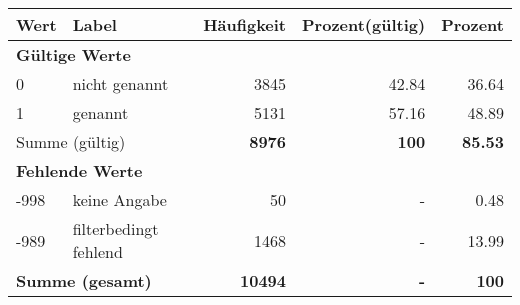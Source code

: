      \begin{longtable}{lXrrr}
     \toprule
     \textbf{Wert} & \textbf{Label} & \textbf{Häufigkeit} & \textbf{Prozent(gültig)} & \textbf{Prozent} \\
     \endhead
     \midrule
     \multicolumn{5}{l}{\textbf{Gültige Werte}}\\

     0 &
     \multicolumn{1}{X}{ nicht genannt   } &


       \num{3845} &
       \num[round-mode=places,round-precision=2]{42.84} &
         \num[round-mode=places,round-precision=2]{36.64} \\

     1 &
     \multicolumn{1}{X}{ genannt   } &


       \num{5131} &
       \num[round-mode=places,round-precision=2]{57.16} &
         \num[round-mode=places,round-precision=2]{48.89} \\
     \midrule
     \multicolumn{2}{l}{Summe (gültig)} &
       \textbf{\num{8976}} &
     \textbf{\num{100}} &
       \textbf{\num[round-mode=places,round-precision=2]{85.53}} \\
     \multicolumn{5}{l}{\textbf{Fehlende Werte}}\\
       -998 &
       keine Angabe &
         \num{50} &
        - &
         \num[round-mode=places,round-precision=2]{0.48} \\
       -989 &
       filterbedingt fehlend &
         \num{1468} &
        - &
         \num[round-mode=places,round-precision=2]{13.99} \\
     \midrule
     \multicolumn{2}{l}{\textbf{Summe (gesamt)}} &
          \textbf{\num{10494}} &
        \textbf{-} &
        \textbf{\num{100}} \\
     \bottomrule
     \end{longtable}
     
